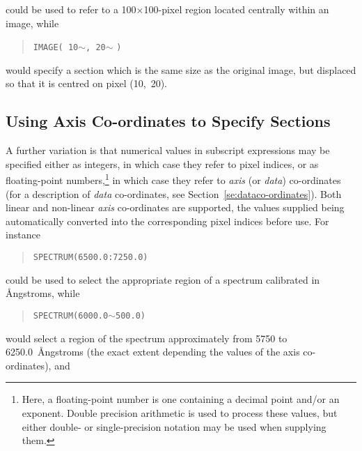 {could be used to refer to a 100$\times$100-pixel region located
centrally within an image, while 

\small
\begin{quote}
\begin{center}
{\tt IMAGE( 10}$\sim${\tt , 20}$\sim$ {\tt )}
\end{center}
\end{quote}
\normalsize

would specify a section which is the same size as the original image, but
displaced so that it is centred on pixel (10,~20).

\subsection{Using Axis Co-ordinates to Specify Sections}
\label{se:axissections}

A further variation is that numerical values in subscript expressions
may be specified either as integers, in which case they refer to pixel
indices, or as floating-point numbers,\footnote{Here, a floating-point
number is one containing a decimal point and/or an exponent. Double
precision arithmetic is used to process these values, but either double-
or single-precision notation may be used when supplying them.} in which
case they refer to {\em axis\/} (or {\em data}) co-ordinates (for a
description of {\em data\/} co-ordinates, see
Section~\ref{se:dataco-ordinates}). Both linear and non-linear {\em
axis\/} co-ordinates are supported, the values supplied being
automatically converted into the corresponding pixel indices before use.
For instance

\small
\begin{quote}
\begin{center}
{\tt SPECTRUM(6500.0:7250.0)}
\end{center}
\end{quote}
\normalsize

could be used to select the appropriate region of a spectrum calibrated
in {\AA}ngstroms, while

\small
\begin{quote}
\begin{center}
{\tt SPECTRUM(6000.0}$\sim${\tt 500.0)}
\end{center}
\end{quote}
\normalsize

would select a region of the spectrum approximately from 5750 to 
6250.0~{\AA}ngstroms (the exact extent depending the values of the
axis co-ordinates), and

}
